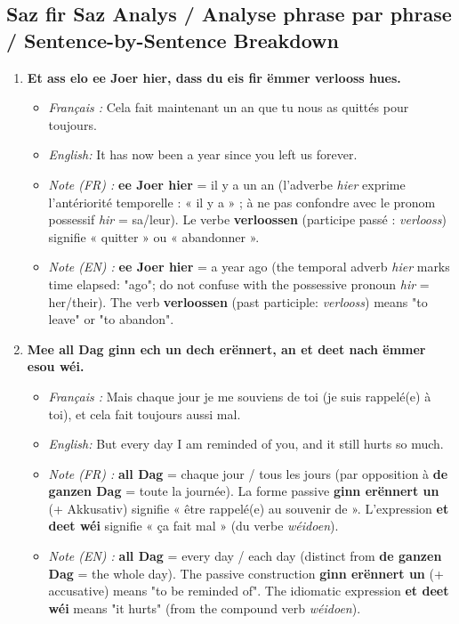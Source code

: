 \vspace{1.2em}

\subsection*{Saz fir Saz Analys / Analyse phrase par phrase / Sentence-by-Sentence Breakdown}

\begin{enumerate}
    \item \textbf{Et ass elo ee Joer hier, dass du eis fir ëmmer verlooss hues.}
    \begin{itemize}
        \item \textit{Français :} Cela fait maintenant un an que tu nous as quittés pour toujours.
        \item \textit{English:} It has now been a year since you left us forever.
        \item \textit{Note (FR) :} \textbf{ee Joer hier} = il y a un an (l'adverbe \textit{hier} exprime l'antériorité temporelle : « il y a » ; à ne pas confondre avec le pronom possessif \textit{hir} = sa/leur). Le verbe \textbf{verloossen} (participe passé : \textit{verlooss}) signifie « quitter » ou « abandonner ».
        \item \textit{Note (EN) :} \textbf{ee Joer hier} = a year ago (the temporal adverb \textit{hier} marks time elapsed: "ago"; do not confuse with the possessive pronoun \textit{hir} = her/their). The verb \textbf{verloossen} (past participle: \textit{verlooss}) means "to leave" or "to abandon".
    \end{itemize}

    \vspace{0.6em}

    \item \textbf{Mee all Dag ginn ech un dech erënnert, an et deet nach ëmmer esou wéi.}
    \begin{itemize}
        \item \textit{Français :} Mais chaque jour je me souviens de toi (je suis rappelé(e) à toi), et cela fait toujours aussi mal.
        \item \textit{English:} But every day I am reminded of you, and it still hurts so much.
        \item \textit{Note (FR) :} \textbf{all Dag} = chaque jour / tous les jours (par opposition à \textbf{de ganzen Dag} = toute la journée). La forme passive \textbf{ginn erënnert un} (+ Akkusativ) signifie « être rappelé(e) au souvenir de ». L'expression \textbf{et deet wéi} signifie « ça fait mal » (du verbe \textit{wéidoen}).
        \item \textit{Note (EN) :} \textbf{all Dag} = every day / each day (distinct from \textbf{de ganzen Dag} = the whole day). The passive construction \textbf{ginn erënnert un} (+ accusative) means "to be reminded of". The idiomatic expression \textbf{et deet wéi} means "it hurts" (from the compound verb \textit{wéidoen}).
    \end{itemize}


\end{enumerate}
